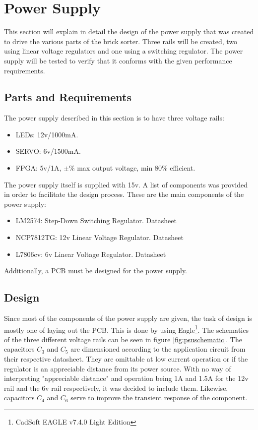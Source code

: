 \section{Power Supply}
This section will explain in detail the design of the power supply that was created to drive the various parts of the brick sorter. Three rails will be created, two using linear voltage regulators and one using a switching regulator. The power supply will be tested to verify that it conforms with the given performance requirements.
\subsection{Parts and Requirements}
The power supply described in this section is to have three voltage rails:
\begin{itemize}
	\item LEDs: 12v/1000mA.
	\item SERVO: 6v/1500mA.
	\item FPGA: 5v/1A, $\pm$\% max output voltage, min 80\% efficient.
\end{itemize}
The power supply itself is supplied with 15v. A list of components was provided in order to facilitate the design process. These are the main components of the power supply:
\begin{itemize}
	\item LM2574: Step-Down Switching Regulator. Datasheet \cite{lm2574}
	\item NCP7812TG: 12v Linear Voltage Regulator. Datasheet \cite{ncp7812}
	\item L7806cv: 6v Linear Voltage Regulator. Datasheet \cite{l7806}
\end{itemize}
Additionally, a PCB must be designed for the power supply.
\subsection{Design}
Since most of the components of the power supply are given, the task of design is mostly one of laying out the PCB. This is done by using Eagle\footnote{CadSoft EAGLE v7.4.0 Light Edition}. The schematics of the three different voltage rails can be seen in figure \ref{fig:psuschematic}.
The capacitors $C_3$ and $C_5$ are dimensioned according to the application circuit from their respective datasheet. They are omittable at low current operation or if the regulator is an appreciable distance from its power source. With no way of interpreting "appreciable distance" and operation being 1A and 1.5A for the 12v rail and the 6v rail respectively, it was decided to include them. Likewise, capacitors $C_4$ and $C_6$ serve to improve the transient response of the component.

